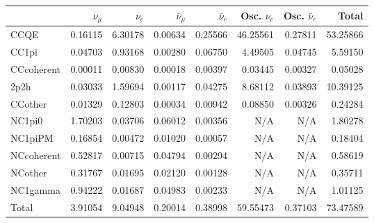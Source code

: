 \begin{tabular} { | l ||r | r | r | r | r | r | | r | }
\hline
              & $\nu_\mu$            & $\nu_e$              & $\bar{\nu}_{\mu}$    & $\bar{\nu}_{e}$      & Osc. $\nu_e$         & Osc. $\bar{\nu}_{e}$ & Total                \\ \hline\hline
 CCQE         & 0.16115              & 6.30178              & 0.00634              & 0.25566              & 46.25561             & 0.27811              & 53.25866             \\ \hline
 CC1pi        & 0.04703              & 0.93168              & 0.00280              & 0.06750              & 4.49505              & 0.04745              & 5.59150              \\ \hline
 CCcoherent   & 0.00011              & 0.00830              & 0.00018              & 0.00397              & 0.03445              & 0.00327              & 0.05028              \\ \hline
 2p2h         & 0.03033              & 1.59694              & 0.00117              & 0.04275              & 8.68112              & 0.03893              & 10.39125             \\ \hline
 CCother      & 0.01329              & 0.12803              & 0.00034              & 0.00942              & 0.08850              & 0.00326              & 0.24284              \\ \hline
 NC1pi0       & 1.70203              & 0.03706              & 0.06012              & 0.00356              & N/A                  & N/A                  & 1.80278              \\ \hline
 NC1piPM      & 0.16854              & 0.00472              & 0.01020              & 0.00057              & N/A                  & N/A                  & 0.18404              \\ \hline
 NCcoherent   & 0.52817              & 0.00715              & 0.04794              & 0.00294              & N/A                  & N/A                  & 0.58619              \\ \hline
 NCother      & 0.31767              & 0.01695              & 0.02120              & 0.00128              & N/A                  & N/A                  & 0.35711              \\ \hline
 NC1gamma     & 0.94222              & 0.01687              & 0.04983              & 0.00233              & N/A                  & N/A                  & 1.01125              \\ \hline
\hline
 Total        & 3.91054              & 9.04948              & 0.20014              & 0.38998              & 59.55473             & 0.37103              & 73.47589             \\ \hline

\end{tabular}
